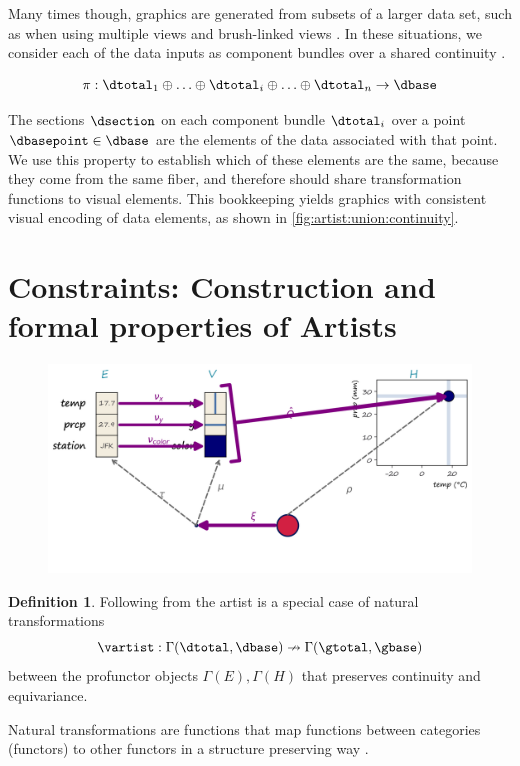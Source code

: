 \documentclass[10pt,journal,compsoc]{IEEEtran}
\theoremstyle{definition}
\newtheorem{definition}{Definition}[section]
\theoremstyle{remark}
\begin{document}
Many times though, graphics are generated from subsets of a larger data set, such as when using multiple views \cite{alboRadarComparativeEvaluation2016a, hullmanKeeping2018} and brush-linked views \cite{beckerBrushingScatterplots1987,bujaInteractiveData1991}. In these situations, we consider each of the data inputs as component bundles over a shared continuity \dbase. 

\begin{equation}
  \label{eq:math:data:base:decompose}
  \pi:\dtotal_1\oplus\ldots\oplus \dtotal_i \oplus\ldots \oplus \dtotal_n \rightarrow \dbase
\end{equation}

The sections $\dsection$ on each component bundle $\dtotal_i$ over a point $\dbasepoint \in \dbase$ are the elements of the data associated with that point. We use this property to establish which of these elements are the same, because they come from the same fiber, and therefore should share transformation functions to visual elements. This bookkeeping yields graphics with consistent visual encoding of data elements, as shown in \autoref{fig:artist:union:continuity}. 


\section{Constraints: Construction and formal properties of Artists}
\label{sec:artist:construction}
\begin{figure}[h!]
  \includegraphics[width=\linewidth]{q.png}
  \caption{}
  \label{fig:constraints:q-overall}
\end{figure}


\begin{definition} Following from \label{def:artist:} the artist \vartist is a special case of  natural transformations
  \begin{equation}
    \vartist: \Gamma(\dtotal, \dbase)\nrightarrow \Gamma(\gtotal, \gbase)
  \end{equation}
  between the profunctor objects $\Gamma(E),\Gamma(H)$ that preserves continuity and equivariance.
\end{definition}
  Natural transformations are functions that map functions between categories (functors) to other functors in a structure preserving way \cite{riehlCategoryTheoryContext, spanier1989algebraic, fongInvitationAppliedCategory2019}.
\end{document}
